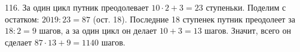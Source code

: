 116. За один цикл путник преодолевает $10\cdot2+3=23$ ступеньки. Поделим с остатком: $2019:23=87$ (ост. 18). Последние 18 ступенек путник преодолеет за $18:2=9$ шагов, а за один цикл он делает $10+3=13$ шагов. Значит, всего он сделает $87\cdot13+9=1140$ шагов.\\
